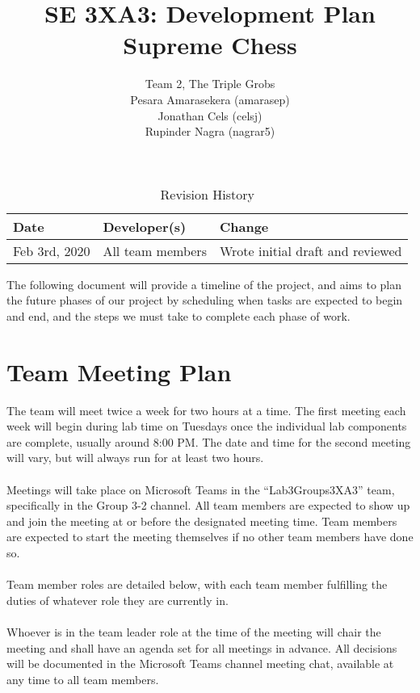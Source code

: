 \documentclass{article}
\title{SE 3XA3: Development Plan\\Supreme Chess}
\author{Team 2, The Triple Grobs
        \\ Pesara Amarasekera (amarasep)
        \\ Jonathan Cels (celsj)
        \\ Rupinder Nagra (nagrar5)
}
\date{}
\begin{document}
\begin{table}[hp]
\caption{Revision History} \label{TblRevisionHistory}
\begin{tabularx}{\textwidth}{llX}
\toprule
\textbf{Date} & \textbf{Developer(s)} & \textbf{Change}\\
\midrule
Feb 3rd, 2020 & All team members & Wrote initial draft and reviewed\\

\bottomrule
\end{tabularx}
\end{table}

\newpage

\maketitle

The following document will provide a timeline of the project, and aims to plan the future phases of our project by scheduling when tasks are expected to begin and end, and the steps we must take to complete each phase of work.

\section{Team Meeting Plan}
The team will meet twice a week for two hours at a time. The first meeting each week will begin during lab time on Tuesdays once the individual lab components are complete, usually around 8:00 PM. The date and time for the second meeting will vary, but will always run for at least two hours.
\\
\\ Meetings will take place on Microsoft Teams in the ``Lab3Groups3XA3'' team, specifically in the Group 3-2 channel. All team members are expected to show up and join the meeting at or before the designated meeting time. Team members are expected to start the meeting themselves if no other team members have done so.
\\
\\ Team member roles are detailed below, with each team member fulfilling the duties of whatever role they are currently in.
\\
\\ Whoever is in the team leader role at the time of the meeting will chair the meeting and shall have an agenda set for all meetings in advance. All decisions will be documented in the Microsoft Teams channel meeting chat, available at any time to all team members.
\end{document}
